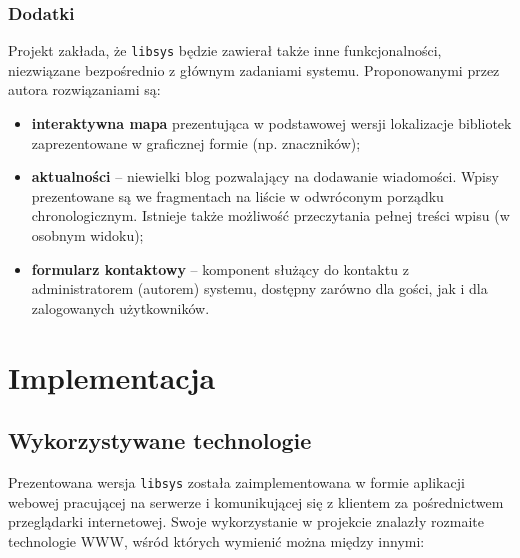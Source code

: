 \documentclass[12pt, a4paper]{article}
\begin{document}
\subsubsection{Dodatki}
Projekt zakłada, że \texttt{libsys} będzie zawierał także inne funkcjonalności, niezwiązane bezpośrednio z głównym zadaniami systemu. Proponowanymi przez autora rozwiązaniami są:


\begin{itemize}
    \item \textbf{interaktywna mapa} prezentująca w podstawowej wersji lokalizacje bibliotek zaprezentowane w graficznej formie (np. znaczników);
    \item \textbf{aktualności} -- niewielki blog pozwalający na dodawanie wiadomości. Wpisy prezentowane są we fragmentach na liście w odwróconym porządku chronologicznym. Istnieje także możliwość przeczytania pełnej treści wpisu (w osobnym widoku);
    \item \textbf{formularz kontaktowy} -- komponent służący do kontaktu z administratorem (autorem) systemu, dostępny zarówno dla gości, jak i dla zalogowanych użytkowników.
\end{itemize}

\section{Implementacja}
\subsection{Wykorzystywane technologie}
Prezentowana wersja \texttt{libsys} została zaimplementowana w formie aplikacji webowej pracującej na serwerze i komunikującej się z klientem za pośrednictwem przeglądarki internetowej. Swoje wykorzystanie w projekcie znalazły rozmaite technologie WWW, wśród których wymienić można między innymi:
\end{document}
